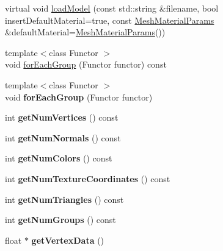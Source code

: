 \begin{DoxyCompactItemize}
\item 
virtual void \hyperlink{class_mesh_base_a7280f0d6bacd225bb2d0263f17c05e8f}{load\+Model} (const std\+::string \&filename, bool insert\+Default\+Material=true, const \hyperlink{class_mesh_material_params}{Mesh\+Material\+Params} \&default\+Material=\hyperlink{class_mesh_material_params}{Mesh\+Material\+Params}())
\item 
{\footnotesize template$<$class Functor $>$ }\\void \hyperlink{class_mesh_base_a63937b1025ad3f9b4b2a4733a7409ff0}{for\+Each\+Group} (Functor functor) const
\item 
\mbox{\label{class_mesh_base_a42fa472a3674008ac76ff1d4779f626f}} 
{\footnotesize template$<$class Functor $>$ }\\void {\bfseries for\+Each\+Group} (Functor functor)
\item 
\mbox{\label{class_mesh_base_a37b7b4a3e6240858d04074492b5196a1}} 
int {\bfseries get\+Num\+Vertices} () const
\item 
\mbox{\label{class_mesh_base_a8a3c2ae360ac491677a08d5dd1d6a70d}} 
int {\bfseries get\+Num\+Normals} () const
\item 
\mbox{\label{class_mesh_base_abc6eb296a90a5d6b0459fcf8be694c73}} 
int {\bfseries get\+Num\+Colors} () const
\item 
\mbox{\label{class_mesh_base_abeef82c768a229d566e646cf87a40972}} 
int {\bfseries get\+Num\+Texture\+Coordinates} () const
\item 
\mbox{\label{class_mesh_base_ae3c47be68bf007cdfa0eedd019fb7f6f}} 
int {\bfseries get\+Num\+Triangles} () const
\item 
\mbox{\label{class_mesh_base_a05df5823f6b7b8bddc51c52d774d8c37}} 
int {\bfseries get\+Num\+Groups} () const
\item 
\mbox{\label{class_mesh_base_ad7d9d7ad3d442611cbd981bc28e16a3a}} 
float $\ast$ {\bfseries get\+Vertex\+Data} ()
\item 
\mbox{\label{class_mesh_base_aafcd96a999e70db59afb18963fcc0da9}} 

\end{DoxyCompactItemize}
